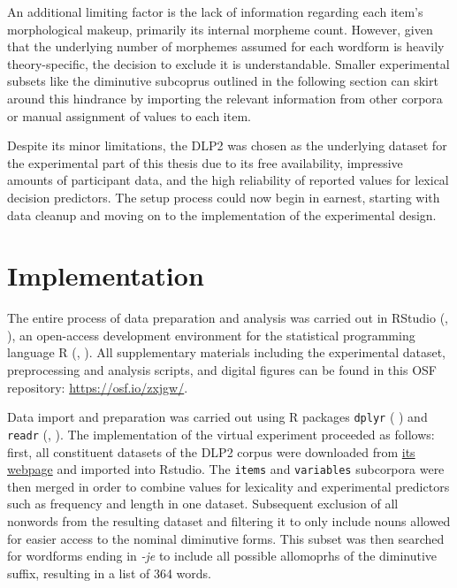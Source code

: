 An additional limiting factor is the lack of information regarding each item's morphological makeup, primarily its internal morpheme count. However, given that the underlying number of morphemes assumed for each wordform is heavily theory-specific, the decision to exclude it is understandable. Smaller experimental subsets like the diminutive subcoprus outlined in the following section can skirt around this hindrance by importing the relevant information from other corpora or manual assignment of values to each item.

Despite its minor limitations, the DLP2 was chosen as the underlying dataset for the experimental part of this thesis due to its free availability, impressive amounts of participant data, and the high reliability of reported values for lexical decision predictors. The setup process could now begin in earnest, starting with data cleanup and moving on to the implementation of the experimental design.

\section{Implementation}
The entire process of data preparation and analysis was carried out in RStudio (\citeauthor{RStudio}, \citeyear{RStudio}), an open-access development environment for the statistical programming language R (\citeauthor{rlang}, \citeyear{rlang}). All supplementary materials including the experimental dataset, preprocessing and analysis scripts, and digital figures can be found in this OSF repository: \url{https://osf.io/zxjgw/}. 

Data import and preparation was carried out using R packages \texttt{dplyr} (\citeauthor{dplyr+2022} \citeyear{dplyr+2022}) and \texttt{readr} (\citeauthor{readr+2022}, \citeyear{readr+2022}). The implementation of the virtual experiment proceeded as follows: first, all constituent datasets of the DLP2 corpus were downloaded from \href{http://crr.ugent.be/archives/1796}{its webpage} and imported into Rstudio. The \texttt{items} and \texttt{variables} subcorpora were then merged in order to combine values for lexicality and experimental predictors such as frequency and length in one dataset. Subsequent exclusion of all nonwords from the resulting dataset and filtering it to only include nouns allowed for easier access to the nominal diminutive forms. This subset was then searched for wordforms ending in \textit{-je} to include all possible allomoprhs of the diminutive suffix, resulting in a list of 364 words.


